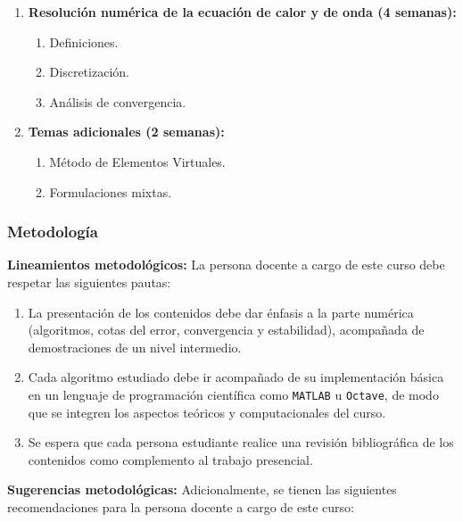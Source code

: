 \begin{refsection}
\begin{enumerate}
\item \textbf{Resolución numérica de la ecuación de calor y de onda (4 semanas):}
\begin{enumerate}
    \item Definiciones.
    \item Discretización.
    \item Análisis de convergencia.
\end{enumerate}

\item \textbf{Temas adicionales (2 semanas):}
\begin{enumerate}
    \item Método de Elementos Virtuales.
    \item Formulaciones mixtas.
\end{enumerate}

\end{enumerate}

\subsubsection*{Metodología}

\noindent \textbf{Lineamientos metodológicos:} La persona docente a cargo de este curso debe respetar las siguientes pautas:

\begin{enumerate}
    \item La presentación de los contenidos debe dar énfasis a la parte numérica (algoritmos, cotas del error, convergencia y estabilidad), acompañada de demostraciones de un nivel intermedio.
    \item Cada algoritmo estudiado debe ir acompañado de su implementación básica en un lenguaje de programación científica como \texttt{MATLAB} u \texttt{Octave}, de modo que se integren los aspectos teóricos y computacionales del curso.
    \item Se espera que cada persona estudiante realice una revisión bibliográfica de los contenidos como complemento al trabajo presencial.
\end{enumerate}

\textbf{Sugerencias metodológicas:} Adicionalmente, se tienen las siguientes recomendaciones para la persona docente a cargo de este curso:


\end{refsection}
